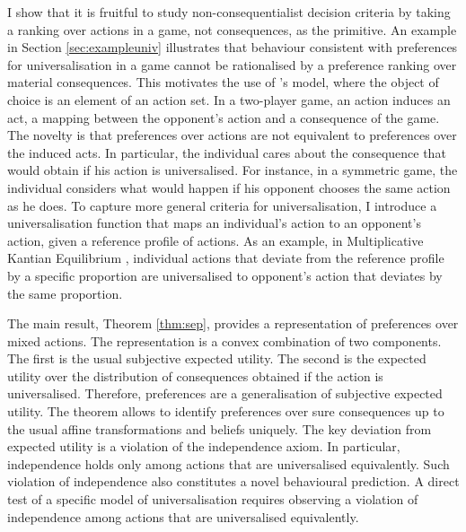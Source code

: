 I show that it is fruitful to study non-consequentialist decision criteria by taking a ranking over actions in a game, not consequences, as the primitive. An example in Section \ref{sec:exampleuniv} illustrates that behaviour consistent with preferences for universalisation in a game cannot be rationalised by a preference ranking over material consequences. This motivates the use of \cite{luce1957games}'s model, where the object of choice is an element of an action set. In a two-player game, an action induces an act, a mapping between the opponent's action and a consequence of the game. The novelty is that preferences over actions are not equivalent to preferences over the induced acts. In particular, the individual cares about the consequence that would obtain if his action is universalised. For instance, in a symmetric game, the individual considers what would happen if his opponent chooses the same action as he does. To capture more general criteria for universalisation, I introduce a universalisation function that maps an individual's action to an opponent's action, given a reference profile of actions. As an example, in Multiplicative Kantian Equilibrium \citep{roemer2019cooperate}, individual actions that deviate from the reference profile by a specific proportion are universalised to opponent's action that deviates by the same proportion.

The main result, Theorem \ref{thm:sep}, provides a representation of preferences over mixed actions. The representation is a convex combination of two components. The first is the usual subjective expected utility. The second is the expected utility over the distribution of consequences obtained if the action is universalised. Therefore, preferences are a generalisation of subjective expected utility. The theorem allows to identify preferences over sure consequences up to the usual affine transformations and beliefs uniquely. The key deviation from expected utility is a violation of the independence axiom. In particular, independence holds only among actions that are universalised equivalently. Such violation of independence also constitutes a novel behavioural prediction. A direct test of a specific model of universalisation requires observing a violation of independence among actions that are universalised equivalently.

